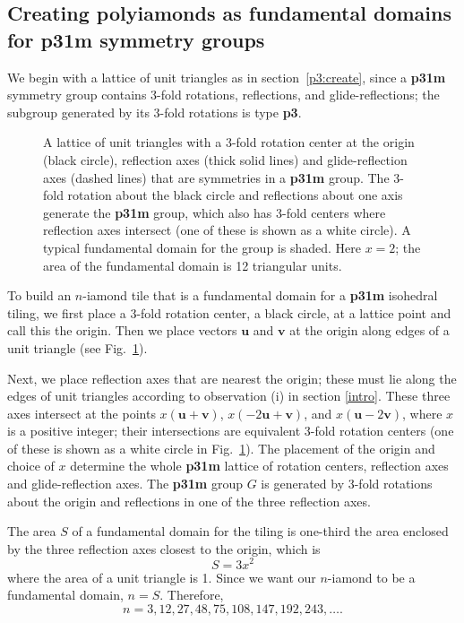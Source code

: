 \documentclass{ws-ijcga}
\begin{document}
\subsection{Creating polyiamonds as fundamental domains for {\bf p31m} symmetry groups}
\label{p31m:create}
We begin with a lattice of unit triangles as in section~\ref{p3:create}, 
since a {\bf p31m} symmetry group contains 3-fold rotations, reflections, and glide-reflections; 
the subgroup generated by its 3-fold rotations is type {\bf p3}. 
\begin{figure}[h]
\centerline{
}
\vspace*{8pt}
\caption{
A lattice of unit triangles with a 3-fold rotation center at the origin (black circle), reflection axes 
(thick solid lines) and glide-reflection axes (dashed lines) that are symmetries in a {\bf p31m} group. 
The 3-fold rotation about the
black circle and reflections about one axis generate the {\bf p31m} group, 
which also has 3-fold centers where reflection
axes intersect (one of these is shown as a white circle). 
A typical fundamental domain for the group is shaded. 
Here $x = 2$; the area of the fundamental domain is 12 triangular units.
\label{fig:p31m}
}
\end{figure}
To build an $n$-iamond tile that is a fundamental domain for a {\bf p31m} isohedral tiling,
we first place a 3-fold rotation center, a black circle, at a lattice point and call this the origin.
Then we place vectors $\mathbf u$ and $\mathbf v$ at the origin along edges of a unit triangle (see Fig.~\ref{fig:p31m}). 

Next, we place reflection axes that are nearest the origin; 
these must lie along the edges of
unit triangles according to observation (i) in section \ref{intro}. 
These three axes intersect at the points
$x ({\mathbf u}+{\mathbf v})$, $x(-2{\mathbf u} +{\mathbf v})$, and $x({\mathbf u} -2{\mathbf v})$, 
where $x$ is a positive integer; 
their intersections are equivalent 3-fold rotation centers 
(one of these is shown as a white circle in Fig.~\ref{fig:p31m}). 
The placement of the origin and choice of $x$ determine the whole {\bf p31m} lattice of 
rotation centers, reflection axes and glide-reflection axes. 
The {\bf p31m} group $G$ is generated by 3-fold rotations about the origin and
reflections in one of the three reflection axes.

The area $S$ of a fundamental domain for the tiling is one-third the area enclosed by the
three reflection axes closest to the origin, which is
\begin{equation}
S=3 x^2
\end{equation}
where the area of a unit triangle is 1. 
Since we want our $n$-iamond to be a fundamental domain, $n = S$. 
Therefore,
\begin{equation}
n=3, 12, 27, 48, 75, 108, 147, 192, 243, \ldots.
\label{p31m:n}
\end{equation}  
\end{document}
